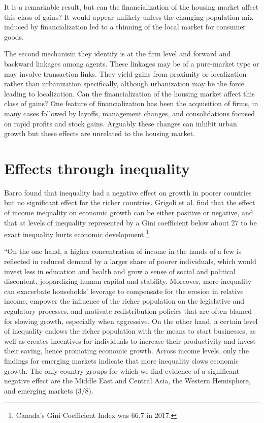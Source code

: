  It is a remarkable result, but can the financialization of the housing market affect this class of  gains? It would appear unlikely unless the changing population mix induced by financialization led to a thinning of the local market for consumer goods. 

 The second mechanism they identify is at the firm level and forward and backward linkages among agents. These linkages may be of a pure-market type or may involve transaction links. They yield  gains from proximity or localization rather than urbanization specifically, although urbanization may be the force leading to localization. Can the financialization of the housing market affect this class of  gains? One feature of financialization has been the acquisition of firms, in many cases followed by layoffs, management changes, and consolidations focused on rapid profits and stock gains. Arguably these changes can inhibit urban growth but these effects are unrelated to the housing market.
 

\section{Effects through inequality}
Barro \cite{barroInequalityGrowthInvestment1999} found that inequality had a negative effect on growth in poorer countries but no significant effect for the richer countries. Grigoli et al. \cite{grigoliInequalityGrowthHeterogeneous2016} find  that the effect of income inequality on economic growth can be either positive or negative, and that at levels  of inequality  represented by a Gini coefficient below about 27  to be exact inequality hurts economic development.\footnote{Canada's Gini Coefficient Index was 66.7 in 2017. } %

 ``On the one hand, a higher concentration of income in the hands of a few is reflected in reduced demand by a larger share of poorer individuals, which would invest less in education and health and grow a sense of social and political discontent, jeopardizing human capital and stability. Moreover, more inequality can exacerbate households' leverage to compensate for the erosion in relative income, empower the influence of the richer population on the legislative and regulatory processes, and motivate redistribution policies that are often blamed for slowing growth, especially when aggressive. On the other hand, a certain level of inequality endows the richer population with the means to start businesses, as well as creates incentives for individuals to increase their productivity and invest their saving, hence promoting economic growth. Across income levels, only the findings for emerging markets indicate that more inequality slows economic growth. The only country groups for which we find evidence of a significant negative effect are the Middle East and Central Asia, the Western Hemisphere, and emerging markets (3/8).

